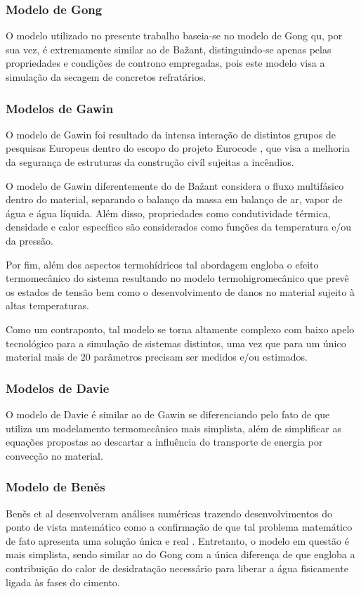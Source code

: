 \subsubsection{Modelo de Gong}
O modelo utilizado no presente trabalho baseia-se no modelo de Gong
\cite{Gong1995a} qu, por sua vez, é extremamente similar ao de Ba\v{z}ant,
distinguindo-se apenas pelas propriedades e condições de controno
empregadas, pois este modelo visa a simulação da secagem de
concretos refratários.
    
    
\subsubsection{Modelos de Gawin}
O modelo de Gawin\cite{Gawin1999} foi resultado da intensa interação de
distintos grupos de pesquisas Europeus dentro do escopo do projeto Eurocode
\cite{Eurocode}, que visa a melhoria da segurança de estruturas da construção
civíl sujeitas a incêndios.

O modelo de Gawin diferentemente do de Ba\v{z}ant considera o fluxo multifásico
dentro do material, separando o balanço da massa em balanço de ar, vapor de água
e água líquida. Além disso, propriedades como condutividade térmica, densidade e
calor específico são considerados como funções da temperatura e/ou da pressão.

Por fim, além dos aspectos termohídricos tal abordagem engloba o efeito
termomecânico do sistema resultando no modelo termohigromecânico que prevê os
estados de tensão bem como o desenvolvimento de danos no material sujeito à
altas temperaturas.

Como um contraponto, tal modelo se torna altamente complexo com baixo apelo
tecnológico para a simulação de sistemas distintos, uma vez que para um único
material mais de 20 parâmetros precisam ser medidos e/ou estimados.
    
\subsubsection{Modelos de Davie}
O modelo de Davie é similar ao de Gawin se diferenciando pelo fato de que
utiliza um modelamento termomecânico mais simplista, além de simplificar as
equações propostas ao descartar a influência do transporte de energia por
convecção no material.
    
\subsubsection{Modelo de Ben\v{e}s}
Ben\v{e}s et al desenvolveram análises numéricas trazendo desenvolvimentos do
ponto de vista matemático como a confirmação de que tal problema matemático de
fato apresenta uma solução única e real \cite{Benes2013a}. Entretanto, o modelo
em questão é mais simplista, sendo similar ao do Gong com a única diferença de que
engloba a contribuição do calor de desidratação necessário para liberar a água
fisicamente ligada às fases do cimento.
    
